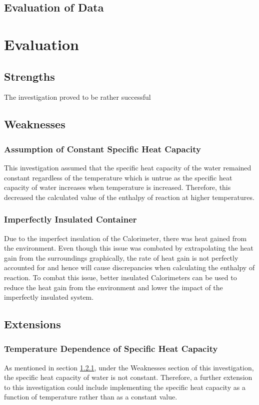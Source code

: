 \documentclass{article}
\begin{document}
\subsection{Evaluation of Data}

\section{Evaluation}
\subsection{Strengths}
The investigation proved to be rather successful 

\subsection{Weaknesses} 
\subsubsection{Assumption of Constant Specific Heat Capacity} \label{subsection1}
This investigation assumed that the specific heat capacity of the water remained constant regardless of the temperature which is untrue as the specific heat capacity of water increases when temperature is increased. Therefore, this decreased the calculated value of the enthalpy of reaction at higher temperatures.

\subsubsection{Imperfectly Insulated Container}
Due to the imperfect insulation of the Calorimeter, there was heat gained from the environment. Even though this issue was combated by extrapolating the heat gain from the surroundings graphically, the rate of heat gain is not perfectly accounted for and hence will cause discrepancies when calculating the enthalpy of reaction. To combat this issue, better insulated Calorimeters can be used to reduce the heat gain from the environment and lower the impact of the imperfectly insulated system. 

\subsection{Extensions}
\subsubsection{Temperature Dependence of Specific Heat Capacity}
As mentioned in section \ref{subsection1}, under the Weaknesses section of this investigation, the specific heat capacity of water is not constant. Therefore, a further extension to this investigation could include implementing the specific heat capacity as a function of temperature rather than as a constant value.
\end{document}
